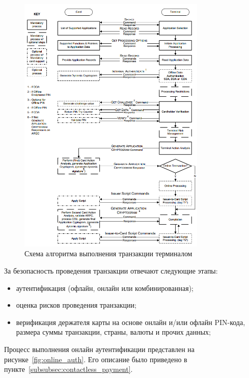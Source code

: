 \begin{figure}[H]
    \centering
    \includegraphics[width=0.8\textwidth]{images/research/transaction_flow_example}
    \caption{\centering Схема алгоритма выполнения транзакции терминалом}
    \label{fig:transaction_flow_example}
\end{figure}

За безопасность проведения транзакции отвечают следующие этапы:

\begin{itemize}
    \item аутентификация (офлайн, онлайн или комбинированная);
    \item оценка рисков проведения транзакции;
    \item верификация держателя карты на основе онлайн и/или офлайн PIN-кода, размера суммы транзакции, страны, валюты и прочих данных;
\end{itemize}

Процесс выполнения онлайн аутентификации представлен на рисунке~\ref{fig:online_auth}.
Его описание было приведено в пункте~\ref{subsubsec:contactless_payment}.

